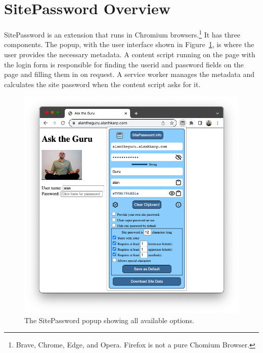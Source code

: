 \section{SitePassword Overview}\label{sec:overview}

SitePassword is an extension that runs in Chromium browsers.\footnote{Brave, Chrome, Edge, and Opera.  Firefox is not a pure Chomium Browser.}  It has three components.  The popup, with the user interface shown in Figure~\ref{fig:popup}, is where the user provides the necessary metadata.  A content script running on the page with the login form is responsible for finding the userid and password fields on the page and filling them in on request.  A service worker manages the metadata and calculates the site password when the content script asks for it.  

\begin{figure}
\begin{center}
  \includegraphics[scale=0.30]{soupsfig1.png}
\end{center}
\caption{\label{fig:popup} The SitePassword popup showing all available
options. }
\end{figure}

